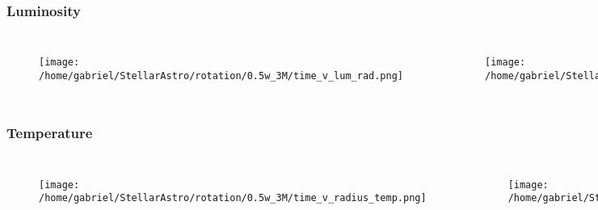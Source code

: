 \documentclass{beamer}
\begin{document}
\begin{frame}
\frametitle{Luminosity}
        \begin{columns}[c]
\begin{figure}
    \begin{center}
      \texttt{[image: /home/gabriel/StellarAstro/rotation/0.5w\_3M/time\_v\_lum\_rad.png]}
    \end{center}
  \end{figure}

        \begin{figure}
    \begin{center}
      \texttt{[image: /home/gabriel/StellarAstro/rotation/0.9w\_3M/time\_v\_lum\_rad.png]}
    \end{center}
  \end{figure}

        \end{columns}
\end{frame}




\begin{frame}
\frametitle{Temperature}
        \begin{columns}[c]
\begin{figure}
    \begin{center}
      \texttt{[image: /home/gabriel/StellarAstro/rotation/0.5w\_3M/time\_v\_radius\_temp.png]}
    \end{center}
  \end{figure}

        \begin{figure}
    \begin{center}
      \texttt{[image: /home/gabriel/StellarAstro/rotation/0.9w\_3M/time\_v\_radius\_temp.png]}
    \end{center}
  \end{figure}

        \end{columns}
\end{frame}

\end{document}
